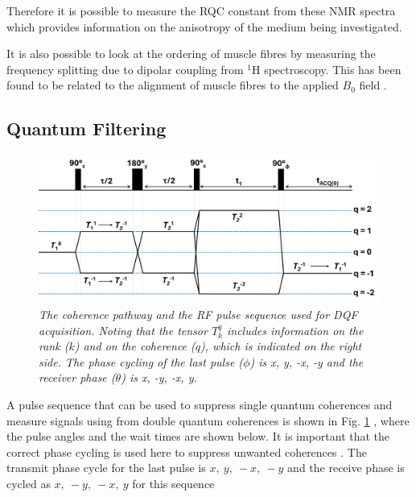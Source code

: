 Therefore it is possible to measure the \ac{RQC} constant from these \ac{NMR} spectra which provides information on the anisotropy of the medium being investigated.

It is also possible to look at the ordering of muscle fibres by measuring the frequency splitting due to dipolar coupling from $^1$H spectroscopy. This has been found to be related to the alignment of muscle fibres to the applied $B_0$ field \cite{Kreis1994Liquid-Crystal-likeSpectroscopy}. 


\subsection{Quantum Filtering}

\begin{figure}
    \centering
    \includegraphics[width=1\textwidth]{Figures/Quad/DQF_Coherence.png}
    \caption{\textit{The coherence pathway and the RF pulse sequence used for \ac{DQF} acquisition. Noting that the tensor $T_k^q$ includes information on the rank ($k$) and on the coherence ($q$), which is indicated on the right side. The phase cycling of the last pulse ($\phi$) is x, y, -x, -y and the receiver phase ($\theta$) is x, -y, -x, y.}}
    \label{fig:Quad:Coherence}
\end{figure}

A pulse sequence that can be used to suppress single quantum coherences and measure signals using from double quantum coherences is shown in Fig. \ref{fig:Quad:Coherence} \cite{Sharf1995DetectionNMR-Spectroscopy}, where the pulse angles and the wait times are shown below. It is important that the correct phase cycling is used here to suppress unwanted coherences \cite{Bodenhausen1984SelectionExperiments}. The transmit phase cycle for the last pulse is $x,\:y,\:-x,\:-y$ and the receive phase is cycled as $x,\:-y,\:-x,\:y$ for this sequence

